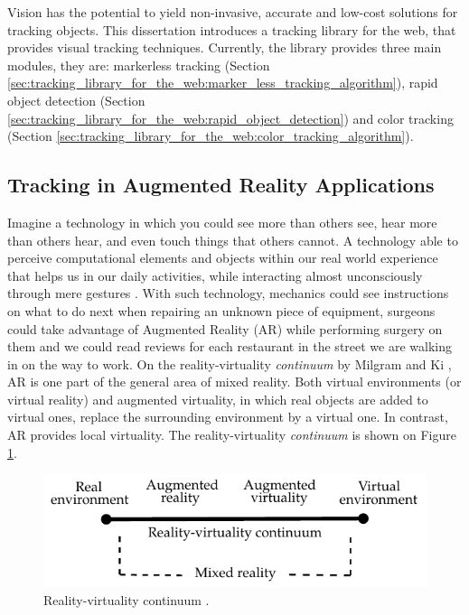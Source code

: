 Vision has the potential to yield non-invasive, accurate and low-cost solutions for tracking objects. This dissertation introduces a tracking library for the web, that provides visual tracking techniques. Currently, the library provides three main modules, they are: markerless tracking (Section \ref{sec:tracking_library_for_the_web:marker_less_tracking_algorithm}), rapid object detection (Section \ref{sec:tracking_library_for_the_web:rapid_object_detection}) and color tracking (Section \ref{sec:tracking_library_for_the_web:color_tracking_algorithm}).


\subsection{Tracking in Augmented Reality Applications} %
\label{sub:basic_concepts:visual_tracking:tracking_in_augmented_reality_applications}

Imagine a technology in which you could see more than others see, hear more than others hear, and even touch things that others cannot. A technology able to perceive computational elements and objects within our real world experience that helps us in our daily activities, while interacting almost unconsciously through mere gestures \cite{Krevelen2010,Teichrieb2007}. With such technology, mechanics could see instructions on what to do next when repairing an unknown piece of equipment, surgeons could take advantage of Augmented Reality (AR) while performing surgery on them and we could read reviews for each restaurant in the street we are walking in on the way to work. On the reality-virtuality \textit{continuum} by Milgram and Ki \cite{Mistry2009}, AR is one part of the general area of mixed reality. Both virtual environments (or virtual reality) and augmented virtuality, in which real objects are added to virtual ones, replace the surrounding environment by a virtual one. In contrast, AR provides local virtuality. The reality-virtuality \textit{continuum} is shown on Figure \ref{figure:reality_continuum}.

\begin{figure}[!htb]
  \centering
  \includegraphics{chapters/basic_concepts/reality_continuum.pdf}
  \caption{Reality-virtuality continuum \cite{Benford1998}.}
  \label{figure:reality_continuum}
\end{figure}

